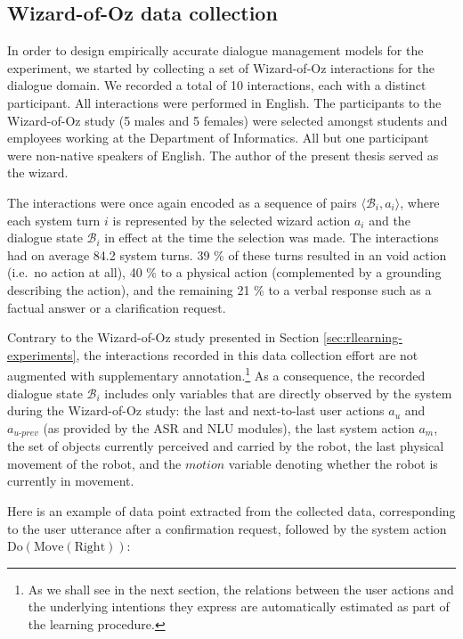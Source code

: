 \subsection{Wizard-of-Oz data collection}
\label{sec:wozcollection-exp3}

In order to design empirically accurate dialogue management models for the experiment, we started by collecting a set of Wizard-of-Oz interactions for the dialogue domain. We recorded a total of 10 interactions, each with a distinct participant. All interactions were performed in English. The participants to the Wizard-of-Oz study (5 males and 5 females) were selected amongst students and employees working at the Department of Informatics. All but one participant were non-native speakers of English. The author of the present thesis served as the wizard.

The interactions were once again encoded as a sequence of pairs $\langle \mathcal{B}_i, a_i \rangle$, where each system turn $i$ is represented by the selected wizard action $a_i$ and the dialogue state $\mathcal{B}_i$ in effect at the time the selection was made. The interactions had on average 84.2 system turns.  39 \% of these turns resulted in an void action (i.e.\ no action at all), 40 \% to a physical action (complemented by a grounding describing the action), and the remaining 21 \% to a verbal response such as a factual answer or a clarification request. 

Contrary to the Wizard-of-Oz study presented in Section \ref{sec:rllearning-experiments}, the interactions recorded in this data collection effort are not augmented with supplementary annotation.\footnote{As we shall see in the next section, the relations between the user actions and the underlying intentions they express are automatically estimated as part of the learning procedure.} As a consequence, the recorded dialogue state $\mathcal{B}_i$ includes only variables that are directly observed by the system during the Wizard-of-Oz study: the last and next-to-last user actions $a_u$ and $a_{u\mbox{-}prev}$ (as provided by the ASR and NLU modules), the last system action $a_m$, the set of objects currently perceived and carried by the robot, the last physical movement of the robot, and the $\mathit{motion}$ variable denoting whether the robot is currently in movement. 

Here is an example of data point extracted from the collected data, corresponding to the user utterance  after a confirmation request, followed by the system action $\mathrm{Do(Move(Right))}$: 

